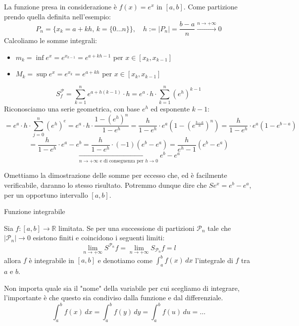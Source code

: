 \documentclass[12pt]{report}
\newcommand{\R}{\mathbb{R}}
\begin{document}
	\begin{osservazione}{}{}
		La funzione presa in considerazione è $f(x) = e^x$ in $[a, b]$.
		Come partizione prendo quella definita nell'esempio:
		\[
		P_n = \{x_k = a + kh,\, k = \{0 \dots n\}\}, \quad h := |P_n| = \frac{b-a}{n} \xrightarrow{n \to +\infty} 0
		\]
		Calcoliamo le somme integrali:
		\begin{itemize}
			\item $m_k = \inf e^x = e^{x_{k-1}} = e^{a + kh - 1}$ per $x \in [x_k, x_{k-1}]$
			\item $M_k = \sup e^x = e^{x_k} = e^{a + kh}$ per $x \in [x_k, x_{k-1}]$
		\end{itemize}
		
		\[
		S_f^\mathcal{P} = \sum_{k=1}^{n} e^{a + h(k-1)} \cdot h = e^a \cdot h \cdot \sum_{k=1}^{n} (e^h)^{k-1}
		\]
		Riconosciamo una serie geometrica, con base $e^h$ ed esponente $k-1$:
		\[
		= e^a \cdot h \cdot \sum_{j=0}^{n} (e^h)^e = e^a \cdot h \cdot \frac{1 - (e^h)^n}{1 - e^h} = \frac{h}{1 - e^h} \cdot e^a \left(1 - (e^{\frac{b-a}{n}})^n\right) = \frac{h}{1 - e^h} \cdot e^a (1 - e^{b-a})
		\]
		\[
		= \frac{h}{1 - e^h} \cdot e^a - e^b = \frac{h}{1 - e^h} \cdot (-1) (e^b - e^a) = \frac{h}{e^h - 1} (e^b - e^a)
		\]
		\[
		\xrightarrow[n \to +\infty \text{ e di conseguenza per } h \to 0]{} e^b - e^a
		\]
		
	\end{osservazione}
	
	Omettiamo la dimostrazione delle somme per eccesso che, ed è facilmente verificabile, daranno lo stesso risultato.
	Potremmo dunque dire che $S e^x = e^b - e^a$, per un opportuno intervallo $[a, b]$.
	
	\begin{definizione}{Funzione integrabile}{}
		
		Sia $f: [a, b] \to \R$ limitata.
		Se per una successione di partizioni $\mathcal{P}_n$ tale che $|\mathcal{P}_n| \to 0$ esistono finiti e coincidono i seguenti limiti:
		\[
		\lim_{n \to +\infty} S^{\mathcal{P}_n} f = \lim_{n \to +\infty} S_{\mathcal{P}_n} f = l
		\]
		allora $f$ è integrabile in $[a, b]$ e denotiamo come $\int_{a}^{b} f(x) \, dx$ l'integrale di $f$ tra $a$ e $b$.
		
	\end{definizione}
	
	\begin{osservazione}{}{}
		
		Non importa quale sia il "nome" della variabile per cui scegliamo di integrare, l'importante è che questo sia condiviso dalla funzione e dal differenziale.
		\[
		\int_{a}^{b} f(x) \, dx = \int_{a}^{b} f(y) \, dy = \int_{a}^{b} f(u) \, du = \dots
		\]
		
	\end{osservazione}
	
\end{document}
